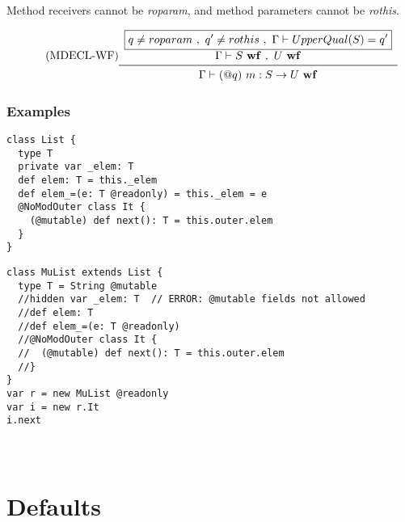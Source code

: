 \vspace{0.4cm}

Method receivers cannot be {\em roparam}, and
method parameters cannot be {\em rothis}.

\begin{equation*}\tag{\mbox{MDECL-WF}}\label{equ-mdecl-wf}
\begin{array}{c}
\boxed{q \ne roparam\ ,\ q' \ne rothis\ ,\ \Gamma \vdash UpperQual(S) = q'}\\
\Gamma \vdash S\ {\bf wf}\ ,\ U\ {\bf wf} \\
\midrule
\Gamma \vdash (@q)\ m:S \rightarrow U\ {\bf wf} \\
\end{array}
\end{equation*}

\vspace{0.4cm}

\newpage
\subsubsection{Examples}

\begin{lstlisting}
class List {
  type T
  private var _elem: T
  def elem: T = this._elem
  def elem_=(e: T @readonly) = this._elem = e
  @NoModOuter class It {
    (@mutable) def next(): T = this.outer.elem
  }
}
\end{lstlisting}

\begin{lstlisting}
class MuList extends List {
  type T = String @mutable
  //hidden var _elem: T  // ERROR: @mutable fields not allowed
  //def elem: T
  //def elem_=(e: T @readonly)
  //@NoModOuter class It {
  //  (@mutable) def next(): T = this.outer.elem
  //}
}
var r = new MuList @readonly
var i = new r.It
i.next
\end{lstlisting}



\section{}

\begin{lstlisting}

\end{lstlisting}

\section{Defaults}

